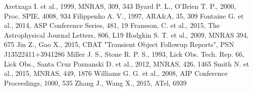 \documentclass[a4paper,fleqn,usenatbib]{mnras}
\begin{document}
\begin{thebibliography}{99}
 Aretxaga I. et al., 1999, MNRAS, 309, 343
 Byard P. L., O'Brien T. P., 2000, Proc. SPIE, 4008, 934
 Filippenko A. V., 1997, ARA\&A, 35, 309
 Fontaine G. et al., 2014, ASP Conference Series, 481, 19
 Fransson, C. et al., 2015, The Astrophysical Journal Letters, 806, L19
 Hodgkin S. T. et al., 2009, MNRAS 394, 675
 Jin Z., Gao X., 2015, CBAT "Transient Object Followup Reports", PSN J13522411+3941286
 Miller J. S., Stone R. P. S., 1993, Lick Obs. Tech. Rep. 66, Lick Obs., Santa Cruz
 Poznanski D. et al., 2012, MNRAS, 426, 1465
 Smith N. et al., 2015, MNRAS, 449, 1876
 Williams G. G. et al., 2008, AIP Conference Proceedings, 1000, 535
 Zhang J., Wang X., 2015, ATel, 6939
\end{thebibliography}


\bsp	%
\label{lastpage}
\end{document}
